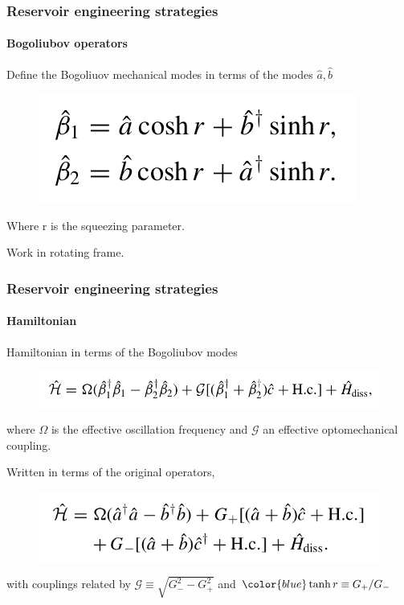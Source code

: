 \documentclass[aspectratio=43]{beamer}
\begin{document}
\begin{frame}
	
	\frametitle{Reservoir engineering strategies}
	\framesubtitle{Bogoliubov operators}
	
	Define the {\color{blue}Bogoliuov} mechanical modes in terms of the modes $\hat{a}, \hat{b}$
	\begin{figure}
		\includegraphics[width = 4.5 cm]{plots/bogoliubov_1.png}
	\end{figure}	

	Where r is the {\color{blue}squeezing parameter}.
	
	\vspace{0.5 cm}
	
	Work in rotating frame.

\end{frame}

\begin{frame}
	
	\frametitle{Reservoir engineering strategies}
	\framesubtitle{Hamiltonian}
	
	Hamiltonian in terms of the Bogoliubov modes
	\begin{figure}
		\includegraphics[width = 8.5 cm]{plots/hamiltonian_3.png}
	\end{figure}	
	
	where $\Omega$ is the effective oscillation frequency and $\mathcal{G}$ an effective optomechanical coupling.
	
	\vspace{0.5 cm}
	
	Written in terms of the original operators,
	\begin{figure}
		\includegraphics[width = 7.5 cm]{plots/hamiltonian_4.png}
	\end{figure}
	
	with couplings related by $\mathcal{G} \equiv \sqrt{G_{-}^{2} - G_{+}^{2}}$ and ${\color{blue}\tanh r \equiv G_{+}/G_{-}}$

\end{frame}
\end{document}
